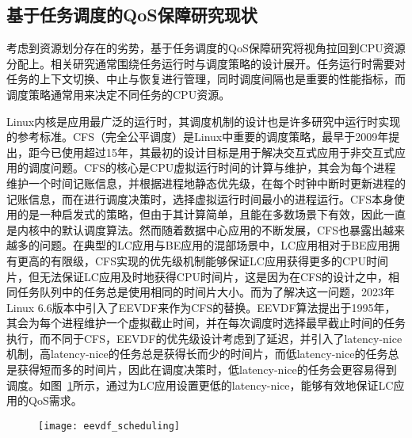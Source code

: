 \subsection{基于任务调度的QoS保障研究现状}


考虑到资源划分存在的劣势，基于任务调度的QoS保障研究将视角拉回到CPU资源分配上。相关研究通常围绕任务运行时与调度策略的设计展开。任务运行时需要对任务的上下文切换、中止与恢复进行管理，同时调度间隔也是重要的性能指标，而调度策略通常用来决定不同任务的CPU资源。

Linux内核是应用最广泛的运行时，其调度机制的设计也是许多研究中运行时实现的参考标准。CFS（完全公平调度）\citep{pabla2009completely}是Linux中重要的调度策略，最早于2009年提出，距今已使用超过15年，其最初的设计目标是用于解决交互式应用于非交互式应用的调度问题。CFS的核心是CPU虚拟运行时间的计算与维护，其会为每个进程维护一个时间记账信息，并根据进程地静态优先级，在每个时钟中断时更新进程的记账信息，而在进行调度决策时，选择虚拟运行时间最小的进程运行。CFS本身使用的是一种启发式的策略，但由于其计算简单，且能在多数场景下有效，因此一直是内核中的默认调度算法。然而随着数据中心应用的不断发展，CFS也暴露出越来越多的问题。在典型的LC应用与BE应用的混部场景中，LC应用相对于BE应用拥有更高的有限级，CFS实现的优先级机制能够保证LC应用获得更多的CPU时间片，但无法保证LC应用及时地获得CPU时间片，这是因为在CFS的设计之中，相同任务队列中的任务总是使用相同的时间片大小。而为了解决这一问题，2023年Linux 6.6版本中引入了EEVDF来作为CFS的替换。EEVDF算法\citep{stoica1995earliest}提出于1995年，其会为每个进程维护一个虚拟截止时间，并在每次调度时选择最早截止时间的任务执行，而不同于CFS，EEVDF的优先级设计考虑到了延迟，并引入了latency-nice机制，高latency-nice的任务总是获得长而少的时间片，而低latency-nice的任务总是获得短而多的时间片，因此在调度决策时，低latency-nice的任务会更容易得到调度。如图~\ref{fig:eevdf_scheduling}所示，通过为LC应用设置更低的latency-nice，能够有效地保证LC应用的QoS需求。

\begin{figure}[!htbp]
    \centering
    \texttt{[image: eevdf\_scheduling]}
    \label{fig:eevdf_scheduling}
\end{figure}

